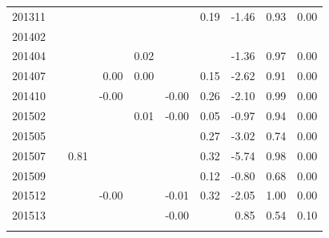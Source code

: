 \begin{table}
\begin{tabular}{rrrrrrrrrr}
 201311 &  &  &  &  &  & 0.19 & -1.46 & 0.93 & 0.00 \\ 
 201402 &  &  &  &  &  &  &  &  &  \\ 
 201404 &  &  &  & 0.02 &  &  & -1.36 & 0.97 & 0.00 \\ 
 201407 &  &  & 0.00 & 0.00 &  & 0.15 & -2.62 & 0.91 & 0.00 \\ 
 201410 &  &  & -0.00 &  & -0.00 & 0.26 & -2.10 & 0.99 & 0.00 \\ 
 201502 &  &  &  & 0.01 & -0.00 & 0.05 & -0.97 & 0.94 & 0.00 \\ 
 201505 &  &  &  &  &  & 0.27 & -3.02 & 0.74 & 0.00 \\ 
 201507 &  & 0.81 &  &  &  & 0.32 & -5.74 & 0.98 & 0.00 \\ 
 201509 &  &  &  &  &  & 0.12 & -0.80 & 0.68 & 0.00 \\ 
 201512 &  &  & -0.00 &  & -0.01 & 0.32 & -2.05 & 1.00 & 0.00 \\ 
 201513 &  &  &  &  & -0.00 &  & 0.85 & 0.54 & 0.10 \\
   \hline
\noalign{\smallskip}\hline
\end{tabular}
\end{table}




%
%



